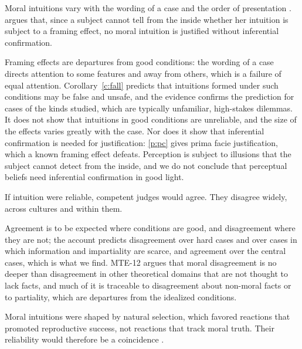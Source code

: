 \documentclass{situationist-preprint}
\begin{document}
\begin{objection}
Moral intuitions vary with the wording of a case and the order of presentation \citep{Petrinovich1996}. \citet{SinnottArmstrong2008} argues that, since a subject cannot tell from the inside whether her intuition is subject to a framing effect, no moral intuition is justified without inferential confirmation.
\end{objection}

\begin{reply}
Framing effects are departures from good conditions: the wording of a case directs attention to some features and away from others, which is a failure of equal attention. Corollary~\ref{c:fall} predicts that intuitions formed under such conditions may be false and unsafe, and the evidence confirms the prediction for cases of the kinds studied, which are typically unfamiliar, high-stakes dilemmas. It does not show that intuitions in good conditions are unreliable, and the size of the effects varies greatly with the case. Nor does it show that inferential confirmation is needed for justification: \ref{p:pc} gives prima facie justification, which a known framing effect defeats. Perception is subject to illusions that the subject cannot detect from the inside, and we do not conclude that perceptual beliefs need inferential confirmation in good light.
\end{reply}

\begin{objection}[Disagreement]
If intuition were reliable, competent judges would agree. They disagree widely, across cultures and within them.
\end{objection}

\begin{reply}
Agreement is to be expected where conditions are good, and disagreement where they are not; the account predicts disagreement over hard cases and over cases in which information and impartiality are scarce, and agreement over the central cases, which is what we find. MTE-12 argues that moral disagreement is no deeper than disagreement in other theoretical domains that are not thought to lack facts, and much of it is traceable to disagreement about non-moral facts or to partiality, which are departures from the idealized conditions.
\end{reply}

\begin{objection}[Debunking]
Moral intuitions were shaped by natural selection, which favored reactions that promoted reproductive success, not reactions that track moral truth. Their reliability would therefore be a coincidence \citep{Street2006}.
\end{objection}
\end{document}
